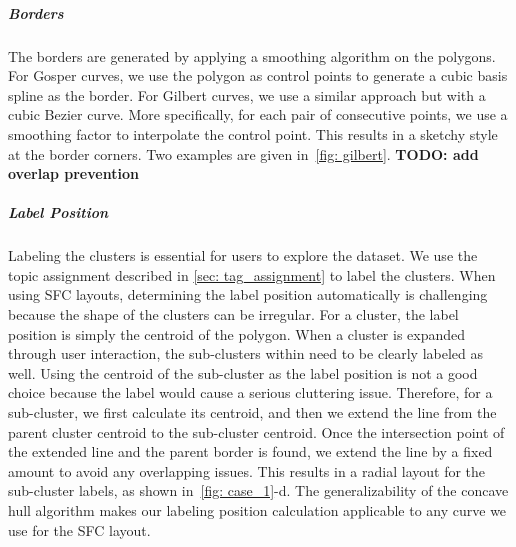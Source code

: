 \vspace*{-0.3cm}
\subparagraph*{Borders} 
The borders are generated by applying a smoothing algorithm on the polygons.
For Gosper curves, we use the polygon as control points to generate a cubic basis spline as the border.
For Gilbert curves, we use a similar approach but with a cubic Bezier curve.
More specifically, for each pair of consecutive points, we use a smoothing factor to interpolate the control point.
This results in a sketchy style at the border corners.
Two examples are given in~\autoref{fig: gilbert}.
\textbf{TODO: add overlap prevention}

\vspace*{-0.3cm}
\subparagraph*{Label Position}
Labeling the clusters is essential for users to explore the dataset.
We use the topic assignment described in \autoref{sec: tag_assignment} to label the clusters.
When using SFC layouts, determining the label position automatically is challenging because the shape of the clusters can be irregular.
For a cluster, the label position is simply the centroid of the polygon.
When a cluster is expanded through user interaction, the sub-clusters within need to be clearly labeled as well.
Using the centroid of the sub-cluster as the label position is not a good choice because the label would cause a serious cluttering issue.
Therefore, for a sub-cluster, we first calculate its centroid, and then we extend the line from the parent cluster centroid to the sub-cluster centroid. 
Once the intersection point of the extended line and the parent border is found, we extend the line by a fixed amount to avoid any overlapping issues.
This results in a radial layout for the sub-cluster labels, as shown in~\autoref{fig: case_1}-d.
The generalizability of the concave hull algorithm makes our labeling position calculation applicable to any curve we use for the SFC layout.


